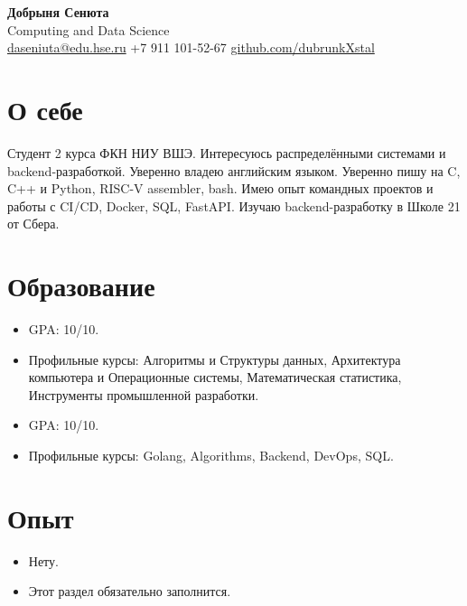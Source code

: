 \documentclass[a4paper,10pt]{article}
\begin{document}
\begin{center}
  {\Huge\bfseries\color{accent} Добрыня Сенюта}\\[4pt]
  {\large Computing and Data Science}\\[6pt]
  \href{mailto:daseniuta@edu.hse.ru}{daseniuta@edu.hse.ru} \quad
  +7 911 101-52-67 \quad
  \href{https://github.com/dubrunkXstal}{github.com/dubrunkXstal} \quad
\end{center}

\section{О себе}
Студент 2 курса ФКН НИУ ВШЭ. Интересуюсь распределёнными системами и backend-разработкой.
Уверенно владею английским языком.
Уверенно пишу на C, C++ и Python, RISC-V assembler, bash.
Имею опыт командных проектов и работы с CI/CD, Docker, SQL, FastAPI.
Изучаю backend-разработку в Школе 21 от Сбера.

\section{Образование}
\begin{itemize}
  \item GPA: 10/10. 
  \item Профильные курсы: Алгоритмы и Структуры данных, Архитектура компьютера и Операционные системы, Математическая статистика, Инструменты промышленной разработки.
\end{itemize}

\vspace{10pt}


\begin{itemize}
  \item GPA: 10/10. 
  \item Профильные курсы: Golang, Algorithms, Backend, DevOps, SQL.
\end{itemize}

\section{Опыт}
\begin{itemize}
  \item Нету.
  \item Этот раздел обязательно заполнится.
\end{itemize}
\end{document}

